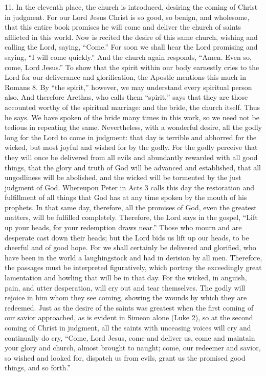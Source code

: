 11. In the eleventh place, the church is introduced, desiring the coming of Christ in judgment. For our Lord Jesus Christ is so good, so benign, and wholesome, that this entire book promises he will come and deliver the church of saints afflicted in this world. Now is recited the desire of this same church, wishing and calling the Lord, saying, “Come.” For soon we shall hear the Lord promising and saying, “I will come quickly.” And the church again responds, “Amen. Even so, come, Lord Jesus.” To show that the spirit within our body earnestly cries to the Lord for our deliverance and glorification, the Apostle mentions this much in Romans 8. By “the spirit,” however, we may understand every spiritual person also. And therefore Arethas, who calls them “spirit,” says that they are those accounted worthy of the spiritual marriage: and the bride, the church itself. Thus he says. We have spoken of the bride many times in this work, so we need not be tedious in repeating the same. Nevertheless, with a wonderful desire, all the godly long for the Lord to come in judgment: that day is terrible and abhorred for the wicked, but most joyful and wished for by the godly. For the godly perceive that they will once be delivered from all evils and abundantly rewarded with all good things, that the glory and truth of God will be advanced and established, that all ungodliness will be abolished, and the wicked will be tormented by the just judgment of God. Whereupon Peter in Acts 3 calls this day the restoration and fulfillment of all things that God has at any time spoken by the mouth of his prophets. In that same day, therefore, all the promises of God, even the greatest matters, will be fulfilled completely. Therefore, the Lord says in the gospel, “Lift up your heads, for your redemption draws near.” Those who mourn and are desperate cast down their heads; but the Lord bids us lift up our heads, to be cheerful and of good hope. For we shall certainly be delivered and glorified, who have been in the world a laughingstock and had in derision by all men. Therefore, the passages must be interpreted figuratively, which portray the exceedingly great lamentation and howling that will be in that day. For the wicked, in anguish, pain, and utter desperation, will cry out and tear themselves. The godly will rejoice in him whom they see coming, showing the wounds by which they are redeemed. Just as the desire of the saints was greatest when the first coming of our savior approached, as is evident in Simeon alone (Luke 2), so at the second coming of Christ in judgment, all the saints with unceasing voices will cry and continually do cry, “Come, Lord Jesus, come and deliver us, come and maintain your glory and church, almost brought to naught; come, our redeemer and savior, so wished and looked for, dispatch us from evils, grant us the promised good things, and so forth.”

